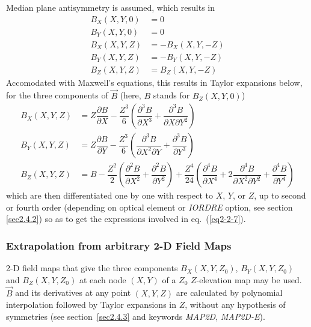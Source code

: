 \smallskip

\noindent Median plane antisymmetry is assumed, which results in 
\begin{equation}
	\begin{aligned}
		B_X(X,Y,0)  &  =   0 \\
		B_Y(X,Y,0) & =  0 \\
		B_X(X,Y,Z)  & =  -B_X(X,Y,-Z) \\
		B_Y(X,Y,Z)  &  =  -B_Y(X,Y,-Z) \\
		B_Z(X,Y,Z) & =   B_Z(X,Y,-Z) 
	\end{aligned}
	\label{eq2-3-2}
\end{equation}
Accomodated with Maxwell's equations, this results 
 in  Taylor expansions below,  for the three components of $ \vec  B $ (here, 
$ B $ stands for $ B_Z(X,Y,0)$) 
\begin{equation}
	\begin{aligned}
		B_X(X,Y,Z) 
		      & =   Z \dfrac{\partial B }{ \partial X} - \dfrac{Z^3 }{ 6} 
		        \left(  \dfrac{\partial^ 3B }{\partial X^3} 
		           + \dfrac{\partial^ 3B }{ \partial X\partial Y^2} \right) \\
		B_Y(X,Y,Z)
		      & =  Z \dfrac{\partial B }{ \partial Y} - \dfrac{Z^3}{ 6} 
		        \left(\dfrac{\partial^ 3B }{\partial X^2\partial Y} 
		           + \dfrac{\partial^ 3B}{ \partial Y^3} \right) \\
		B_Z(X,Y,Z) 
		      & =  B - \dfrac{Z^2 }{ 2} 
		        \left(  \dfrac{\partial^ 2B }{ \partial X^2} 
		           + \dfrac{\partial^ 2B}{\partial Y^2} \right) 
		        + \dfrac{Z^4 }{ 24} 
		        \left( \dfrac{\partial^ 4B }{\partial X^4} 
		           + 2 \dfrac{\partial^ 4B }{ \partial X^2\partial Y^2} 
		           + \dfrac{\partial^4B }{ \partial Y^4} \right)
	\end{aligned}
	\label{eq2-3-3}
\end{equation}
 which are then differentiated one by one with respect to $ X$, $Y$, 
or $ Z$, up to second or fourth order (depending on optical element or 
\textsl{IORDRE} option, see section \ref{sec2.4.2}) so as to get the expressions
 involved in eq.~(\ref{eq2-2-7}). 
 


\subsubsection{Extrapolation from arbitrary 2-D Field Maps}\label{sec2.3.3}

2-D field maps that give the three components $ B_X(X,Y,Z_0)$,  
$B_Y(X,Y,Z_0) $ and $ B_Z(X,Y,Z_0) $ 
at each node $ (X,Y) $ of a $ Z_0 $ $ Z$-elevation map may be used. 
$ \vec  B$ and its derivatives at any point $ (X,Y,Z) $ are calculated by polynomial 
interpolation  followed by Taylor expansions in $ Z$,
without any hypothesis of symmetries (see section~\ref{sec2.4.3} and keywords 
\textsl{MAP2D}, \textsl{MAP2D-E}).

